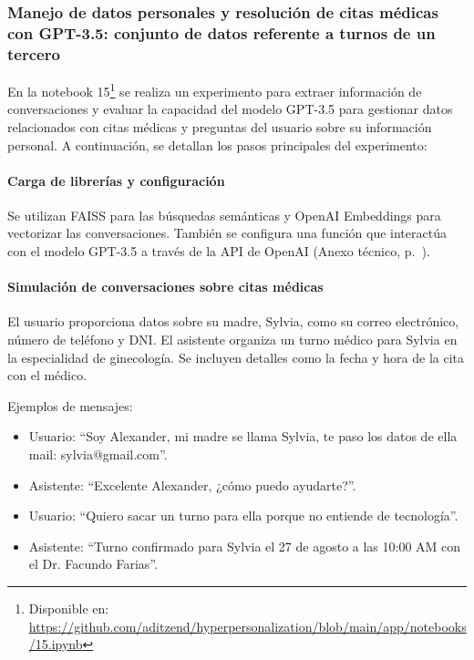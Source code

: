 \subsubsection{Manejo de datos personales y resolución de citas médicas con GPT-3.5: conjunto de datos referente a turnos de un tercero}

En la notebook 15\footnote{Disponible en: \url{https://github.com/aditzend/hyperpersonalization/blob/main/app/notebooks/15.ipynb}} se realiza un experimento para extraer información de conversaciones y evaluar la capacidad del modelo GPT-3.5 para gestionar datos relacionados con citas médicas y preguntas del usuario sobre su información personal. A continuación, se detallan los pasos principales del experimento:

\paragraph{Carga de librerías y configuración}

Se utilizan FAISS para las búsquedas semánticas y OpenAI Embeddings para vectorizar las conversaciones. También se configura una función que interactúa con el modelo GPT-3.5 a través de la API de OpenAI (Anexo técnico, p.~\pageref{anexo:code-4-1-15-1}).

\paragraph{Simulación de conversaciones sobre citas médicas}

El usuario proporciona datos sobre su madre, Sylvia, como su correo electrónico, número de teléfono y DNI. El asistente organiza un turno médico para Sylvia en la especialidad de ginecología. Se incluyen detalles como la fecha y hora de la cita con el médico.

Ejemplos de mensajes:

\begin{itemize}
    \item Usuario: ``Soy Alexander, mi madre se llama Sylvia, te paso los datos de ella mail: sylvia@gmail.com''.
    \item Asistente: ``Excelente Alexander, ¿cómo puedo ayudarte?''.
    \item Usuario: ``Quiero sacar un turno para ella porque no entiende de tecnología''.
    \item Asistente: ``Turno confirmado para Sylvia el 27 de agosto a las 10:00 AM con el Dr. Facundo Farias''.
\end{itemize}

